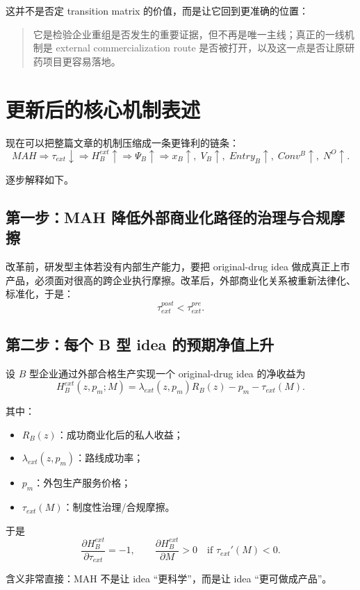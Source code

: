 \documentclass[12pt,fontset=none]{ctexart}
\begin{document}
这并不是否定 transition matrix 的价值，而是让它回到更准确的位置：

\begin{quote}
它是检验企业重组是否发生的重要证据，但不再是唯一主线；真正的一线机制是 external commercialization route 是否被打开，以及这一点是否让原研药项目更容易落地。
\end{quote}

\section{更新后的核心机制表述}

现在可以把整篇文章的机制压缩成一条更锋利的链条：
\[
MAH
\Rightarrow
\tau_{ext}\downarrow
\Rightarrow
H_B^{ext}\uparrow
\Rightarrow
\Psi_B\uparrow
\Rightarrow
x_B\uparrow,\; V_B\uparrow,\; Entry_B\uparrow,\; Conv^B\uparrow,\; N^O\uparrow.
\]

逐步解释如下。

\subsection{第一步：MAH 降低外部商业化路径的治理与合规摩擦}

改革前，研发型主体若没有内部生产能力，要把 original-drug idea 做成真正上市产品，必须面对很高的跨企业执行摩擦。改革后，外部商业化关系被重新法律化、标准化，于是：
\[
\tau_{ext}^{post}<\tau_{ext}^{pre}.
\]

\subsection{第二步：每个 B 型 idea 的预期净值上升}

设 $B$ 型企业通过外部合格生产实现一个 original-drug idea 的净收益为
\[
H_B^{ext}(z,p_m;M)=\lambda_{ext}(z,p_m)R_B(z)-p_m-\tau_{ext}(M).
\]

其中：
\begin{itemize}
    \item $R_B(z)$：成功商业化后的私人收益；
    \item $\lambda_{ext}(z,p_m)$：路线成功率；
    \item $p_m$：外包生产服务价格；
    \item $\tau_{ext}(M)$：制度性治理/合规摩擦。
\end{itemize}

于是
\[
\frac{\partial H_B^{ext}}{\partial \tau_{ext}}=-1,
\qquad
\frac{\partial H_B^{ext}}{\partial M}>0
\quad \text{if } \tau_{ext}'(M)<0.
\]

含义非常直接：MAH 不是让 idea “更科学”，而是让 idea “更可做成产品”。
\end{document}
